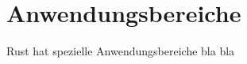 \chapter{Anwendungsbereiche} %
\label{cha:Anwendungsbereiche}
Rust hat spezielle Anwendungsbereiche bla bla
